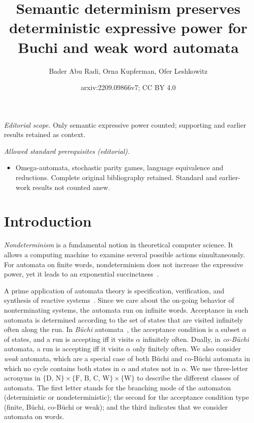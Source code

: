 \documentclass[10pt,a4paper]{amsart}
\title{Semantic determinism preserves deterministic expressive power for Buchi and weak word automata}
\author{Bader Abu Radi, Orna Kupferman, Ofer Leshkowitz}
\date{arxiv:2209.09866v7; CC BY 4.0}
\theoremstyle{definition}
\numberwithin{equation}{section}
\newcommand{\buchi}{B\"uchi\xspace}
\begin{document}
\maketitle
\noindent\textit{Editorial scope.} Only semantic expressive power counted; supporting and earlier results retained as context.\par\medskip
\noindent\textit{Allowed standard prerequisites (editorial).}\begin{itemize}
\item Omega-automata, stochastic parity games, language equivalence and reductions. Complete original bibliography retained. Standard and earlier-work results not counted anew.
\end{itemize}\medskip
\section{Introduction}
\label{intro}
{\em Nondeterminism\/} is a fundamental notion in theoretical computer science. It allows a computing machine to examine several possible actions simultaneously. 
For automata on finite words, nondeterminism does not increase the expressive power, yet it leads to an exponential succinctness~\cite{RS59}. 

A prime application of automata theory is specification, verification, and synthesis of reactive systems~\cite{VW94,Kup18}.  Since we care about the on-going behavior of nonterminating  systems, the automata run on infinite words. Acceptance in such automata is determined according to the set of states that are visited infinitely often along the run. In {\em B\"uchi\/} automata~\cite{Buc62},
the acceptance condition is a subset $\alpha$ of states, and a run is accepting iff it visits $\alpha$ infinitely often. Dually, in {\em co-B\"uchi\/} automata, 
a run is accepting iff it visits $\alpha$ only finitely often. We also consider {\em weak\/} automata, which are a special case of both \buchi and co-\buchi automata in which no cycle contains both states in $\alpha$ and states not in $\alpha$. We use three-letter acronyms in $\{ \text{D, N} \} \times \{ \text{F, B, C, W}\} \times \{\text{W}\}$ to describe the different classes of automata. The first letter stands for the branching mode of the automaton (deterministic or nondeterministic); the second for the acceptance condition type (finite, \buchi, co-\buchi or weak); and the third indicates that we consider automata on words. 
\end{document}
